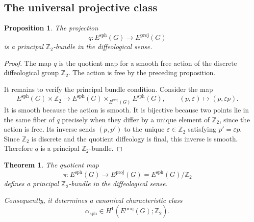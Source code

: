 \documentclass[11pt]{amsart}
\newtheorem{theorem}[definition]{Theorem}
\newtheorem{proposition}[definition]{Proposition}
\begin{document}
\subsection{The universal projective class}

\begin{proposition}
The projection
\[
q:E^{\mathrm{sph}}(G)\longrightarrow E^{\mathrm{proj}}(G)
\]
is a principal \(\mathbb Z_2\)-bundle in the diffeological sense.
\end{proposition}

\begin{proof}
The map \(q\) is the quotient map for a smooth free action of the discrete diffeological group \(\mathbb Z_2\). The action is free by the preceding proposition.

It remains to verify the principal bundle condition. Consider the map
\[
E^{\mathrm{sph}}(G)\times \mathbb Z_2
\longrightarrow
E^{\mathrm{sph}}(G)\times_{E^{\mathrm{proj}}(G)}E^{\mathrm{sph}}(G),
\qquad
(p,\varepsilon)\longmapsto (p,\varepsilon p).
\]
It is smooth because the action is smooth. It is bijective because two points lie in the same fiber of \(q\) precisely when they differ by a unique element of \(\mathbb Z_2\), since the action is free. Its inverse sends \((p,p')\) to the unique \(\varepsilon\in\mathbb Z_2\) satisfying \(p'=\varepsilon p\). Since \(\mathbb Z_2\) is discrete and the quotient diffeology is final, this inverse is smooth. Therefore \(q\) is a principal \(\mathbb Z_2\)-bundle.
\end{proof}

\begin{theorem}
The quotient map
\[
\pi:
E^{\mathrm{sph}}(G)
\longrightarrow
E^{\mathrm{proj}}(G)
=
E^{\mathrm{sph}}(G)/\mathbb Z_2
\]
defines a principal \(\mathbb Z_2\)-bundle in the diffeological sense.

Consequently, it determines a canonical characteristic class
\[
\alpha_{\mathrm{sph}}
\in
H^1(E^{\mathrm{proj}}(G);\mathbb Z_2).
\]
\end{theorem}
\end{document}
